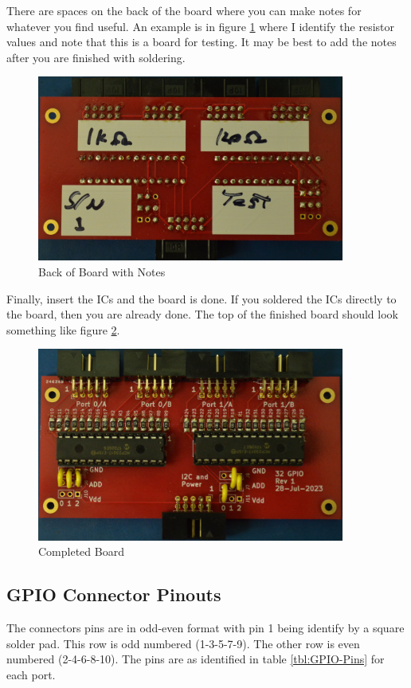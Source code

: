 \documentclass[10pt, openany]{book}
\begin{document}
There are spaces on the back of the board where you can make notes for whatever you find useful.  An example is in figure \ref{fig:Notes} where I identify the resistor values and note that this is a board for testing.  It may be best to add the notes after you are finished with soldering.

\begin{figure}[ht!]
  \centering
  \includegraphics[width=0.9\textwidth]{../Pictures/Notes.jpg}
  \caption{Back of Board with Notes}
  \label{fig:Notes}
\end{figure}

Finally, insert the ICs and the board is done.  If you soldered the ICs directly to the board, then you are already done.  The top of the finished board should look something like figure \ref{fig:Complete}.

\begin{figure}[ht!]
  \centering
  \includegraphics[width=0.9\textwidth]{../Pictures/ICs.jpg}
  \caption{Completed Board}
  \label{fig:Complete}
\end{figure}

\clearpage
\subsection{GPIO Connector Pinouts}
The connectors pins are in odd-even format with pin 1 being identify by a square solder pad.  This row is odd numbered (1-3-5-7-9).  The other row is even numbered (2-4-6-8-10).  The pins are as identified in table \ref{tbl:GPIO-Pins} for each port.
\end{document}

